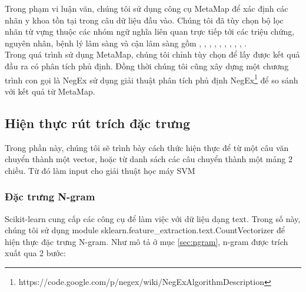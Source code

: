 Trong phạm vi luận văn, chúng tôi sử dụng công cụ MetaMap để xác định các nhãn y khoa tồn tại trong câu dữ liệu đầu vào. Chúng tôi đã tùy chọn bộ lọc nhãn từ vựng thuộc các nhóm ngữ nghĩa liên quan trực tiếp tới các triệu chứng, nguyên nhân, bệnh lý lâm sàng và cận lâm sàng gồm , , , , , , , , , .\\

Trong quá trình sử dụng MetaMap, chúng tôi chỉnh tùy chọn  để lấy được kết quả đầu ra có phân tích phủ định. Đồng thời chúng tôi cũng xây dựng một chương trình con gọi là NegEx sử dụng giải thuật phân tích phủ định NegEx\footnote{https://code.google.com/p/negex/wiki/NegExAlgorithmDescription} để so sánh với kết quả từ MetaMap.

\subsection{Hiện thực rút trích đặc trưng}
Trong phần này, chúng tôi sẽ trình bày cách thức hiện thực để từ một câu văn chuyển thành một vector, hoặc từ danh sách các câu chuyển thành một mảng 2 chiều. Từ đó làm input cho giải thuật học máy SVM
\subsubsection*{Đặc trưng N-gram}
Scikit-learn cung cấp các công cụ để làm việc với dữ liệu dạng text. Trong số này, chúng tôi sử dụng module sklearn.feature\_extraction.text.CountVectorizer để hiện thực đặc trưng N-gram. Như mô tả ở mục \ref{sec:ngram}, n-gram được trích xuất qua 2 bước:\\

